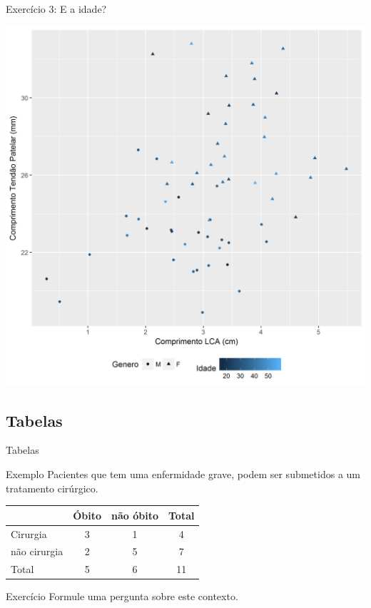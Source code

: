 \documentclass{beamer}
\begin{document}
\begin{frame}{\scriptsize Exercício 3: E a idade?}
  \begin{center}
    \includegraphics[height=.9\textheight]{EDA/EDA-corr3}
  \end{center}
\end{frame}

\subsection{Tabelas}

\begin{frame}{Tabelas}
  \begin{exampleblock}{Exemplo}
    \scriptsize
    Pacientes que tem uma enfermidade grave, podem ser submetidos a um tratamento cirúrgico.

    \bigskip
    \begin{center}
    \begin{tabular}{l|cc|c}
      &Óbito & não óbito & Total\\
      \hline
      Cirurgia & 3 & 1 & 4 \\
      não cirurgia & 2 & 5 & 7\\
      \hline
      Total & 5 & 6 & 11
    \end{tabular}
    \end{center}
  \end{exampleblock}

  \bigskip
  \begin{block}{Exercício}
    Formule uma pergunta sobre este contexto.
  \end{block}
\end{frame}
\end{document}
